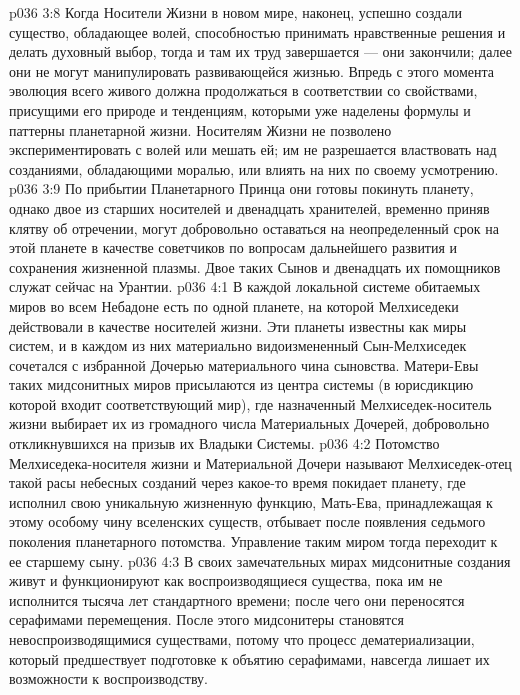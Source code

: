 \vs p036 3:8 Когда Носители Жизни в новом мире, наконец, успешно создали существо, обладающее волей, способностью принимать нравственные решения и делать духовный выбор, тогда и там их труд завершается --- они закончили; далее они не могут манипулировать развивающейся жизнью. Впредь с этого момента эволюция всего живого должна продолжаться в соответствии со свойствами, присущими его природе и тенденциям, которыми уже наделены формулы и паттерны планетарной жизни. Носителям Жизни не позволено экспериментировать с волей или мешать ей; им не разрешается властвовать над созданиями, обладающими моралью, или влиять на них по своему усмотрению.
\vs p036 3:9 По прибытии Планетарного Принца они готовы покинуть планету, однако двое из старших носителей и двенадцать хранителей, временно приняв клятву об отречении, могут добровольно оставаться на неопределенный срок на этой планете в качестве советчиков по вопросам дальнейшего развития и сохранения жизненной плазмы. Двое таких Сынов и двенадцать их помощников служат сейчас на Урантии.
\vs p036 4:1 В каждой локальной системе обитаемых миров во всем Небадоне есть по одной планете, на которой Мелхиседеки действовали в качестве носителей жизни. Эти планеты известны как  миры систем, и в каждом из них материально видоизмененный Сын\hyp{}Мелхиседек сочетался с избранной Дочерью материального чина сыновства. Матери\hyp{}Евы таких мидсонитных миров присылаются из центра системы (в юрисдикцию которой входит соответствующий мир), где назначенный Мелхиседек\hyp{}носитель жизни выбирает их из громадного числа Материальных Дочерей, добровольно откликнувшихся на призыв их Владыки Системы.
\vs p036 4:2 Потомство Мелхиседека\hyp{}носителя жизни и Материальной Дочери называют  Мелхиседек\hyp{}отец такой расы небесных созданий через какое\hyp{}то время покидает планету, где исполнил свою уникальную жизненную функцию, Мать\hyp{}Ева, принадлежащая к этому особому чину вселенских существ, отбывает после появления седьмого поколения планетарного потомства. Управление таким миром тогда переходит к ее старшему сыну.
\vs p036 4:3 В своих замечательных мирах мидсонитные создания живут и функционируют как воспроизводящиеся существа, пока им не исполнится тысяча лет стандартного времени; после чего они переносятся серафимами перемещения. После этого мидсонитеры становятся невоспроизводящимися существами, потому что процесс дематериализации, который предшествует подготовке к объятию серафимами, навсегда лишает их возможности к воспроизводству.
